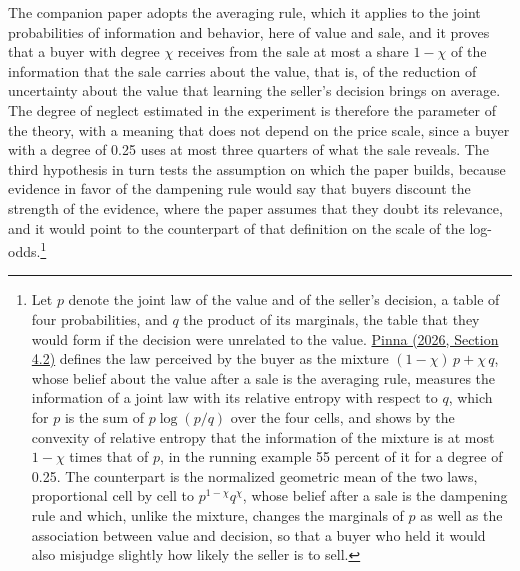 \documentclass[11pt,a4paper]{article}
\newcommand{\cy}[2]{\hyperlink{cite.#1}{\textcolor{citecolor}{#2}}}
\begin{document}
The companion paper adopts the averaging rule, which it applies to the joint probabilities of information and behavior, here of value and sale, and it proves that a buyer with degree $\chi$ receives from the sale at most a share $1-\chi$ of the information that the sale carries about the value, that is, of the reduction of uncertainty about the value that learning the seller's decision brings on average. The degree of neglect estimated in the experiment is therefore the parameter of the theory, with a meaning that does not depend on the price scale, since a buyer with a degree of 0.25 uses at most three quarters of what the sale reveals. The third hypothesis in turn tests the assumption on which the paper builds, because evidence in favor of the dampening rule would say that buyers discount the strength of the evidence, where the paper assumes that they doubt its relevance, and it would point to the counterpart of that definition on the scale of the log-odds.\footnote{Let $p$ denote the joint law of the value and of the seller's decision, a table of four probabilities, and $q$ the product of its marginals, the table that they would form if the decision were unrelated to the value. \cy{pinna}{Pinna (2026, Section 4.2)} defines the law perceived by the buyer as the mixture $(1-\chi)\,p+\chi\,q$, whose belief about the value after a sale is the averaging rule, measures the information of a joint law with its relative entropy with respect to $q$, which for $p$ is the sum of $p\log(p/q)$ over the four cells, and shows by the convexity of relative entropy that the information of the mixture is at most $1-\chi$ times that of $p$, in the running example 55 percent of it for a degree of 0.25. The counterpart is the normalized geometric mean of the two laws, proportional cell by cell to $p^{1-\chi}q^{\chi}$, whose belief after a sale is the dampening rule and which, unlike the mixture, changes the marginals of $p$ as well as the association between value and decision, so that a buyer who held it would also misjudge slightly how likely the seller is to sell.}
\end{document}
